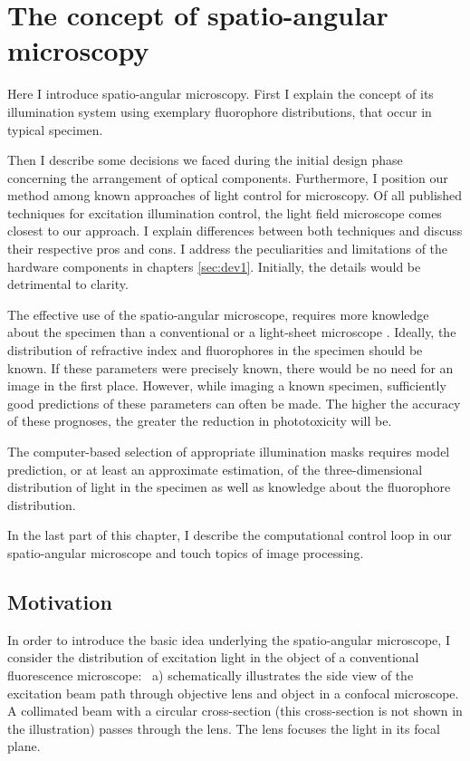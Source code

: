 \chapter{The concept of spatio-angular microscopy}
\label{sec:concept}
\begin{summary}
  Here I introduce spatio-angular microscopy. First I explain the
  concept of its illumination system using exemplary fluorophore
  distributions, that occur in typical specimen.

  Then I describe some decisions we faced during the initial design
  phase concerning the arrangement of optical components. Furthermore,
  I position our method among known approaches of light control for
  microscopy. Of all published techniques for excitation illumination
  control, the light field microscope \citep{Levoy2006} comes closest
  to our approach.  I explain differences between both techniques and
  discuss their respective pros and cons.  I address the peculiarities
  and limitations of the hardware components in chapters
  \ref{sec:dev1}.  Initially, the details would be detrimental to clarity.

  The effective use of the spatio-angular microscope, requires more
  knowledge about the specimen than a conventional or a light-sheet
  microscope \citep{Siedentopf1903,Huisken2004}. Ideally, the distribution of
  refractive index and fluorophores in the specimen should be
  known. If these parameters were precisely known, there would be no
  need for an image in the first place. However, while imaging a known
  specimen, sufficiently good predictions of these parameters can
  often be made. The higher the accuracy of these prognoses, the
  greater the reduction in phototoxicity will be.

  The computer-based selection of appropriate illumination masks
  requires model prediction, or at least an approximate estimation, of
  the three-dimensional distribution of light in the specimen as well as
  knowledge about the fluorophore distribution.

  In the last part of this chapter, I describe the computational
  control loop in our spatio-angular
  microscope and touch topics of image processing.
\end{summary}
\section{Motivation}
In order to introduce the basic idea underlying the spatio-angular
microscope, I consider the distribution of excitation light in the
object of a conventional fluorescence microscope:
~a) schematically illustrates the side view
of the excitation beam path through objective lens and object in a
confocal microscope. A collimated beam with a circular cross-section
(this cross-section is not shown in the illustration) passes through
the lens. The lens focuses the light in its focal plane.

